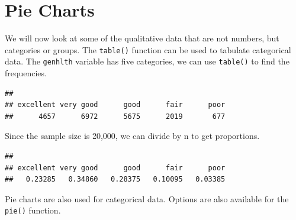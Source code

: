 \documentclass[
]{book}
\newenvironment{Shaded}{\begin{snugshade}}{\end{snugshade}}
\newcommand{\DecValTok}[1]{\textcolor[rgb]{0.00,0.00,0.81}{#1}}
\newcommand{\KeywordTok}[1]{\textcolor[rgb]{0.13,0.29,0.53}{\textbf{#1}}}
\newcommand{\NormalTok}[1]{#1}
\newcommand{\OperatorTok}[1]{\textcolor[rgb]{0.81,0.36,0.00}{\textbf{#1}}}
\begin{document}
\hypertarget{pie-charts}{%
\section{Pie Charts}\label{pie-charts}}

We will now look at some of the qualitative data that are not numbers, but categories or groups. The \texttt{table()} function can be used to tabulate categorical data. The \texttt{genhlth} variable has five categories, we can use \texttt{table()} to find the frequencies.

\begin{Shaded}
\end{Shaded}

\begin{verbatim}
## 
## excellent very good      good      fair      poor 
##      4657      6972      5675      2019       677
\end{verbatim}

Since the sample size is 20,000, we can divide by n to get proportions.

\begin{Shaded}
\end{Shaded}

\begin{verbatim}
## 
## excellent very good      good      fair      poor 
##   0.23285   0.34860   0.28375   0.10095   0.03385
\end{verbatim}

Pie charts are also used for categorical data. Options are also available for the \texttt{pie()} function.

\begin{Shaded}
\end{Shaded}
\end{document}
